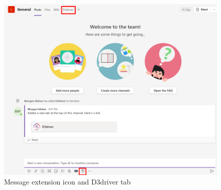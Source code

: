 \begin{figure}
\centering
\includegraphics[width=0.8\linewidth]{figures/meandtabformarking}
\caption{Message extension icon and D3driver tab}
\captionsetup{justification=centering}
\label{fig:meandtabformarking}
\end{figure}

